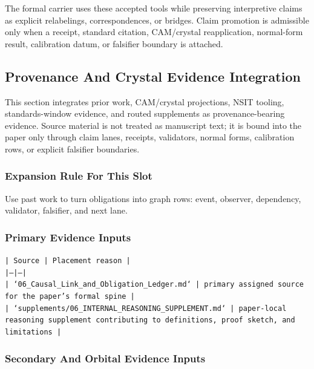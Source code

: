 \documentclass[11pt]{article}
\begin{document}
The formal carrier uses these accepted tools while preserving interpretive
claims as explicit relabelings, correspondences, or bridges. Claim promotion is admissible only when a receipt, standard citation,
CAM/crystal reapplication, normal-form result, calibration datum, or falsifier
boundary is attached.

\subsection*{Provenance And Crystal Evidence Integration}

This section integrates prior work, CAM/crystal projections, NSIT tooling,
standards-window evidence, and routed supplements as provenance-bearing
evidence. Source material is not treated as manuscript text; it is bound into
the paper only through claim lanes, receipts, validators, normal forms,
calibration rows, or explicit falsifier boundaries.

\subsubsection*{Expansion Rule For This Slot}

Use past work to turn obligations into graph rows: event, observer, dependency, validator, falsifier, and next lane.

\subsubsection*{Primary Evidence Inputs}

\noindent\texttt{| Source | Placement reason |}\\
\noindent\texttt{|---|---|}\\
\noindent\texttt{| `06\_Causal\_Link\_and\_Obligation\_Ledger.md` | primary assigned source for the paper's formal spine |}\\
\noindent\texttt{| `supplements/06\_INTERNAL\_REASONING\_SUPPLEMENT.md` | paper-local reasoning supplement contributing to definitions, proof sketch, and limitations |}\\

\subsubsection*{Secondary And Orbital Evidence Inputs}
\end{document}
